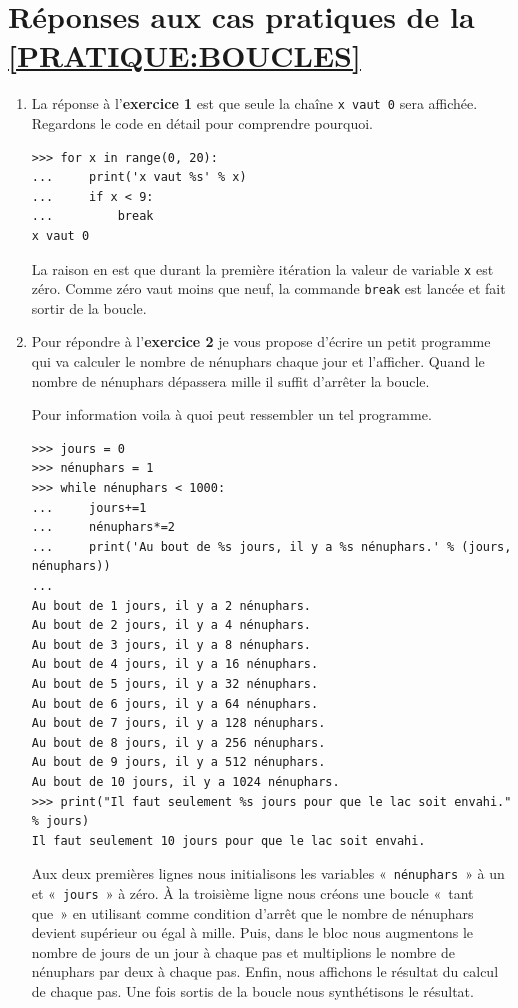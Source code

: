 \section{Réponses aux cas pratiques de la \autoref{PRATIQUE:BOUCLES}\label{REPONSES:BOUCLES}}
\begin{enumerate}
\item La réponse à l'\textbf{exercice 1} est que seule la chaîne \texttt{x vaut 0} sera affichée. Regardons le code en détail pour comprendre pourquoi.
\begin{Verbatim}[frame=single,rulecolor=\color{gray}, label=ne pas taper]
>>> for x in range(0, 20):
... 	print('x vaut %s' % x)
... 	if x < 9:
... 		break
x vaut 0
\end{Verbatim}

La raison en est que durant la première itération la valeur de variable \texttt{x} est zéro. Comme zéro vaut moins que neuf, la commande \texttt{break} est lancée et fait sortir de la boucle.

\item Pour répondre à l'\textbf{exercice 2} je vous propose d'écrire un petit programme qui va calculer le nombre de nénuphars chaque jour et l'afficher. Quand le nombre de nénuphars dépassera mille il suffit d'arrêter la boucle.

Pour information voila à quoi peut ressembler un tel programme.
\begin{Verbatim}[frame=single,rulecolor=\color{gray}, label=ne pas taper]
>>> jours = 0
>>> nénuphars = 1
>>> while nénuphars < 1000:
...     jours+=1
...     nénuphars*=2 
...     print('Au bout de %s jours, il y a %s nénuphars.' % (jours, nénuphars))
... 
Au bout de 1 jours, il y a 2 nénuphars.
Au bout de 2 jours, il y a 4 nénuphars.
Au bout de 3 jours, il y a 8 nénuphars.
Au bout de 4 jours, il y a 16 nénuphars.
Au bout de 5 jours, il y a 32 nénuphars.
Au bout de 6 jours, il y a 64 nénuphars.
Au bout de 7 jours, il y a 128 nénuphars.
Au bout de 8 jours, il y a 256 nénuphars.
Au bout de 9 jours, il y a 512 nénuphars.
Au bout de 10 jours, il y a 1024 nénuphars.
>>> print("Il faut seulement %s jours pour que le lac soit envahi." % jours)
Il faut seulement 10 jours pour que le lac soit envahi.
\end{Verbatim}

Aux deux premières lignes nous initialisons les variables «~\verb+nénuphars+~» à un et «~\verb+jours+~» à zéro.  
À la troisième ligne nous créons une boucle «~tant que~» en utilisant comme condition d'arrêt que le nombre de nénuphars devient supérieur ou égal à mille. Puis, dans le bloc nous augmentons le nombre de jours de un jour à chaque pas et multiplions le nombre de nénuphars par deux à chaque pas. Enfin, nous affichons le résultat du calcul de chaque pas. Une fois sortis de la boucle nous synthétisons le résultat. 
\end{enumerate}

